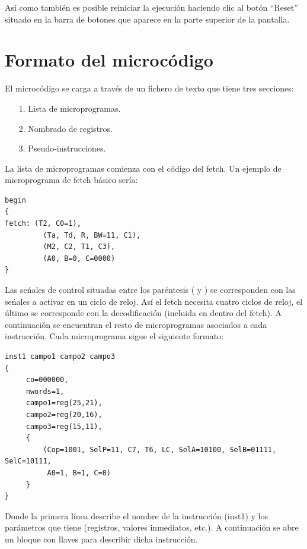 Así como también es posible reiniciar la ejecución haciendo clic al botón ``Reset'' situado en la barra de botones que aparece en la parte superior de la pantalla.

\section*{Formato del microcódigo}

El microcódigo se carga a través de un fichero de texto que tiene tres secciones:

\begin{itemize}

\item[1.] Lista de microprogramas.

\item[2.] Nombrado de registros.

\item[3.] Pseudo-instrucciones.

\end{itemize}

La lista de microprogramas comienza con el código del fetch. Un ejemplo de microprograma de fetch básico sería:

\begin{lstlisting}
begin
{
fetch: (T2, C0=1),
         (Ta, Td, R, BW=11, C1),
         (M2, C2, T1, C3),
         (A0, B=0, C=0000)
}
\end{lstlisting}

Las seńales de control situadas entre los paréntesis ( y ) se corresponden con las seńales a activar en un ciclo de reloj. Así el fetch necesita cuatro ciclos de reloj, el último se corresponde con la decodificación (incluida en dentro del fetch). A continuación se encuentran el resto de microprogramas asociados a cada instrucción. Cada microprograma sigue el siguiente formato:

\begin{lstlisting}
inst1 campo1 campo2 campo3
{
     co=000000,
     nwords=1,
     campo1=reg(25,21),
     campo2=reg(20,16),
     campo3=reg(15,11),
     {
         (Cop=1001, SelP=11, C7, T6, LC, SelA=10100, SelB=01111, SelC=10111,
          A0=1, B=1, C=0)
     }
}
\end{lstlisting}

Donde la primera línea describe el nombre de la instrucción (inst1) y los parámetros que tiene (registros, valores inmediatos, etc.). A continuación se abre un bloque con llaves para describir dicha instrucción.


